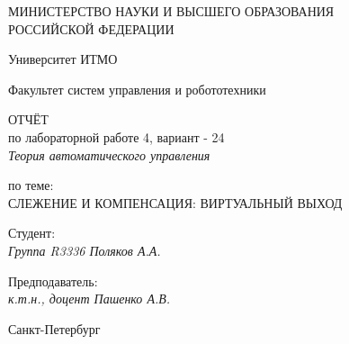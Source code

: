 \thispagestyle{empty}

\begin{center}
    МИНИСТЕРСТВО НАУКИ И ВЫСШЕГО ОБРАЗОВАНИЯ \\ РОССИЙСКОЙ ФЕДЕРАЦИИ

    \vspace{20pt}

    Университет ИТМО

    \vspace{20pt}

    Факультет систем управления и робототехники
\end{center}

\vfill
\begin{center}
    ОТЧЁТ \\  
    по лабораторной работе 4, вариант - 24 \\ 
    \vspace{10pt}
    \textit{Теория автоматического управления}

    \vspace{20pt}

    по теме: \\
    \uppercase{Слежение и компенсация: виртуальный выход}
\end{center}

\vfill

\noindent Студент: \\
\textit{Группа R3336 \hfill Поляков А.А.}


    \vspace{20pt}

    \noindent Предподаватель: \\
    \textit{к.т.н., доцент \hfill  Пашенко А.В.}

\vfill

\begin{center}
    Санкт-Петербург \\ \the\year
\end{center}